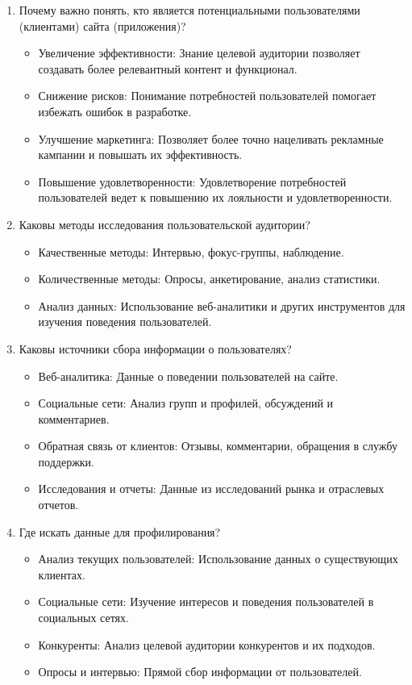 \begin{enumerate}
\item Почему важно понять, кто является потенциальными пользователями (клиентами) сайта (приложения)?

    \begin{itemize}
        \item Увеличение эффективности: Знание целевой аудитории позволяет создавать более релевантный контент и функционал.
        \item Снижение рисков: Понимание потребностей пользователей помогает избежать ошибок в разработке.
        \item Улучшение маркетинга: Позволяет более точно нацеливать рекламные кампании и повышать их эффективность.
        \item Повышение удовлетворенности: Удовлетворение потребностей пользователей ведет к повышению их лояльности и удовлетворенности.
    \end{itemize}

\item Каковы методы исследования пользовательской аудитории?

    \begin{itemize}
        \item Качественные методы: Интервью, фокус-группы, наблюдение.
        \item Количественные методы: Опросы, анкетирование, анализ статистики.
        \item Анализ данных: Использование веб-аналитики и других инструментов для изучения поведения пользователей.
    \end{itemize}

\item Каковы источники сбора информации о пользователях?

    \begin{itemize}
        \item Веб-аналитика: Данные о поведении пользователей на сайте.
        \item Социальные сети: Анализ групп и профилей, обсуждений и комментариев.
        \item Обратная связь от клиентов: Отзывы, комментарии, обращения в службу поддержки.
        \item Исследования и отчеты: Данные из исследований рынка и отраслевых отчетов.
    \end{itemize}

\item Где искать данные для профилирования?
    \begin{itemize}
        \item Анализ текущих пользователей: Использование данных о существующих клиентах.
        \item Социальные сети: Изучение интересов и поведения пользователей в социальных сетях.
        \item Конкуренты: Анализ целевой аудитории конкурентов и их подходов.
        \item Опросы и интервью: Прямой сбор информации от пользователей.
    \end{itemize}


\end{enumerate}
